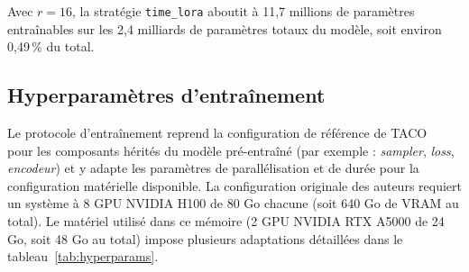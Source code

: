 Avec $r=16$, la stratégie \texttt{time\_lora} aboutit à 11{,}7 millions de paramètres entraînables sur les 2,4 milliards de paramètres totaux du modèle, soit environ 0{,}49\,\% du total.

\subsection{Hyperparamètres d'entraînement}

Le protocole d'entraînement reprend la configuration de référence de TACO~\cite{TACO-2025} pour les composants hérités du modèle pré-entraîné (par exemple : \textit{sampler}, \textit{loss}, \textit{encodeur}) et y adapte les paramètres de parallélisation et de durée pour la configuration matérielle disponible. La configuration originale des auteurs requiert un système à 8 GPU NVIDIA H100 de 80 Go chacune (soit 640 Go de VRAM au total). Le matériel utilisé dans ce mémoire (2 GPU NVIDIA RTX A5000 de 24 Go, soit 48 Go au total) impose plusieurs adaptations détaillées dans le tableau~\ref{tab:hyperparams}.

